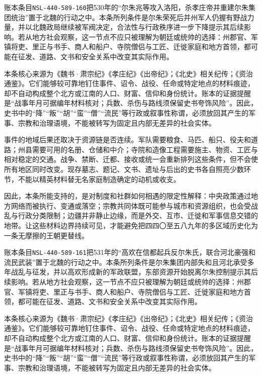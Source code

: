 账本条目\texttt{NSL-440-589-160}把530年的“尔朱兆等攻入洛阳，杀孝庄帝并重建尔朱集团统治”置于北魏的行动之中。本条所列条件是尔朱荣死后并州军人仍握有野战力量，并以北魏政局继续被军阀决定，合法性与行政秩序进一步下降提示其后续影响。若从地方社会观察，这一节点不应只被理解为朝廷或统帅的选择：州郡官、军镇将吏、里正与书手、商人和船户、寺院僧侣与工匠、迁徙家庭和地方首领，都可能在征发、道路、文书和安全关系中改变其实际作用。

本条核心来源为《魏书·肃宗纪》《孝庄纪》《出帝纪》；《北史》相关纪传；《资治通鉴》。它们能够较可靠地钉住事件、诏令、战役、任命或特定地点的材料痕迹，却不自动构成整个北方或江南的人口、财富、信仰和身份统计。账本的证据提醒是“战事年月可据编年材料核对；兵数、杀伤与路线须保留史书夸饰风险”。因此，史书中的“降”“叛”“胡”“蛮”“僧”“流民”等行政或叙事性称谓，必须放回其产生的军事、宗教和治理语境，不能被转写为固定且内部无差异的社会实体。

事件的地域后果还取决于资源链是否连续。军队需要粮食、马匹、船只、役夫和道路；州县需要可用的名册、仓储和中介；寺院和造像工程需要施主、物资、工匠与相对稳定的交通。战争、禁断、迁都、接收或统一会重新排列这些条件，但不会使所有地区同时改变。现存墓志、题记、文书、遗址与后出的史书各自照亮少数环节，不能以精英材料替无名家庭制造确定的动机或收支。

因此，本条所能支持的，是对制度和社群如何相遇的限定性解释：中央政策通过地方网络而被执行、变通或落空；宗教共同体既可能参与城市和资源组织，也会受战乱与行政分类限制；边疆并非静止边缘，而是外交、互市、迁徙和军事信息交错的地带。让这些材料边界持续可见，才能避免把四四〇至五八九年的多区域历史化为一条无摩擦的王朝更替线。

账本条目\texttt{NSL-440-589-161}把531年的“高欢在信都起兵反尔朱氏，联合河北豪强和流民武装”置于北魏的行动之中。本条所列条件是尔朱集团内部失和且河北承受多年战乱与征发，并以高欢形成新的军政联盟，东部资源开始脱离尔朱控制提示其后续影响。若从地方社会观察，这一节点不应只被理解为朝廷或统帅的选择：州郡官、军镇将吏、里正与书手、商人和船户、寺院僧侣与工匠、迁徙家庭和地方首领，都可能在征发、道路、文书和安全关系中改变其实际作用。

本条核心来源为《魏书·肃宗纪》《孝庄纪》《出帝纪》；《北史》相关纪传；《资治通鉴》。它们能够较可靠地钉住事件、诏令、战役、任命或特定地点的材料痕迹，却不自动构成整个北方或江南的人口、财富、信仰和身份统计。账本的证据提醒是“战事年月可据编年材料核对；兵数、杀伤与路线须保留史书夸饰风险”。因此，史书中的“降”“叛”“胡”“蛮”“僧”“流民”等行政或叙事性称谓，必须放回其产生的军事、宗教和治理语境，不能被转写为固定且内部无差异的社会实体。


